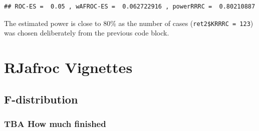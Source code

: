 \documentclass[
]{book}
\newenvironment{Shaded}{\begin{snugshade}}{\end{snugshade}}
\newcommand{\AttributeTok}[1]{\textcolor[rgb]{0.77,0.63,0.00}{#1}}
\newcommand{\ConstantTok}[1]{\textcolor[rgb]{0.00,0.00,0.00}{#1}}
\newcommand{\DecValTok}[1]{\textcolor[rgb]{0.00,0.00,0.81}{#1}}
\newcommand{\FunctionTok}[1]{\textcolor[rgb]{0.00,0.00,0.00}{#1}}
\newcommand{\NormalTok}[1]{#1}
\newcommand{\OtherTok}[1]{\textcolor[rgb]{0.56,0.35,0.01}{#1}}
\newcommand{\SpecialCharTok}[1]{\textcolor[rgb]{0.00,0.00,0.00}{#1}}
\newcommand{\StringTok}[1]{\textcolor[rgb]{0.31,0.60,0.02}{#1}}
\begin{document}
\begin{Shaded}
\end{Shaded}

\begin{verbatim}
## ROC-ES =  0.05 , wAFROC-ES =  0.062722916 , powerRRRC =  0.80210887
\end{verbatim}

The estimated power is close to 80\% as the number of cases (\texttt{ret2\$KRRRC\ =\ 123}) was chosen deliberately from the previous code block.

\hypertarget{part-rjafroc-vignettes}{%
\part*{RJafroc Vignettes}\label{part-rjafroc-vignettes}}

\hypertarget{background-f-distribution}{%
\chapter{F-distribution}\label{background-f-distribution}}

\hypertarget{background-f-distribution-how-much-finished}{%
\section{TBA How much finished}\label{background-f-distribution-how-much-finished}}
\end{document}
